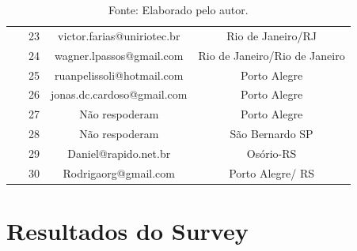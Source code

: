 \documentclass[twoside,english,brazilian]{UNISINOSartigo}
\newcommand{\source}[1]{\caption*{Fonte: {#1}} }
\begin{document}
\begin{table}[h]
\begin{tabularx}{\columnwidth}{cccc}
 ~ & 23 & victor.farias@uniriotec.br & Rio de Janeiro/RJ \\
 ~ & 24 & wagner.lpassos@gmail.com & Rio de Janeiro/Rio de Janeiro \\
 ~ & 25 & ruanpelissoli@hotmail.com & Porto Alegre \\
 ~ & 26 & jonas.dc.cardoso@gmail.com & Porto Alegre \\
 ~ & 27 & Não respoderam & Porto Alegre \\
 ~ & 28 & Não respoderam & São Bernardo SP \\
 ~ & 29 & Daniel@rapido.net.br  & Osório-RS  \\
 ~ & 30 & Rodrigaorg@gmail.com & Porto Alegre/ RS \\ \hline
    \end{tabularx}
    \source{Elaborado pelo autor.}
\end{table}

\section{Resultados do Survey}
\end{document}
